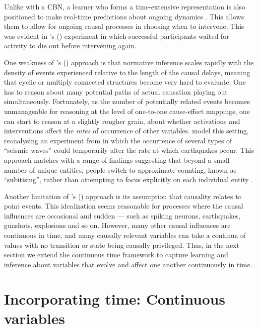 \documentclass{cambridge7A}%
\def\citeapos#1{\citeauthor{#1}'s (\citeyear{#1})}
\begin{document}
Unlike with a CBN, a learner who forms a time-extensive representation is also positioned to make real-time predictions about ongoing dynamics \citep{clark2013whatever}.  This allows them to allow for ongoing causal processes in choosing when to intervene.   This was evident in \citeapos{bramley2017dynamic} experiment in which successful participants waited for activity to die out before intervening again.

One weakness of \citeapos{bramley2018time} approach is that normative inference scales rapidly with the density of events experienced relative to the length of the causal delays, meaning that cyclic or multiply connected structures become very hard to evaluate.  One has to reason about many potential paths of actual causation playing out simultaneously.  Fortunately, as the number of potentially related events becomes unmanageable for reasoning at the level of one-to-one cause-effect mappings, one can start to reason at a slightly rougher grain, about whether activations and interventions affect the \emph{rates} of occurrence of other variables.  \cite{pacer2015upsetting} model this setting, reanalysing an experiment from \cite{lagnado2010influence} in which the occurrence of several types of ``seismic waves'' could temporarily alter the rate at which earthquakes occur.  This approach matches with a range of findings suggesting that beyond a small number of unique entities, people switch to approximate counting, known as ``subitising'', rather than attempting to focus explicitly on each individual entity \citep{mandler1982subitizing}.

Another limitation of \citeapos{bramley2018time} approach is its assumption that causality relates to point events.  This idealization seems reasonable for processes where the causal influences are occasional and sudden --- such as spiking neurons, earthquakes, gunshots, explosions and so on.  However, many other causal influences are continuous in time, and many causally relevant variables can take a continua of values with no transition or state being causally privileged.  Thus, in the next section we extend the continuous time framework to capture learning and inference about variables that evolve and affect one another continuously in time.

\section{Incorporating time: Continuous variables}\label{section:ctcv}
\end{document}
